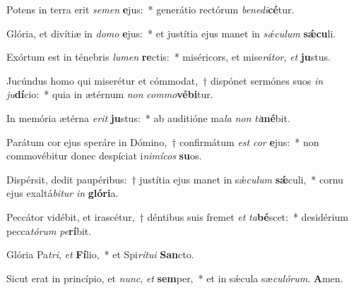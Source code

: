 ﻿\item Potens in terra erit \textit{se}\textit{men} \textbf{e}jus:~* generátio rectórum \textit{be}\textit{ne}\textit{di}\textbf{cé}tur.

\item Glória, et divítiæ in \textit{do}\textit{mo} \textbf{e}jus:~* et justítia ejus manet in \textit{sǽ}\textit{cu}\textit{lum} \textbf{sǽ}\textbf{cu}li.

\item Exórtum est in ténebris \textit{lu}\textit{men} \textbf{re}ctis:~* miséricors, et mise\textit{rá}\textit{tor}, \textit{et} \textbf{ju}stus.

\item Jucúndus homo qui miserétur et cómmodat,~† dispónet sermónes suos \textit{in} \textit{ju}\textbf{dí}cio:~* quia in ætérnum \textit{non} \textit{com}\textit{mo}\textbf{vé}\textbf{bi}tur.

\item In memória ætérna \textit{e}\textit{rit} \textbf{ju}stus:~* ab auditióne ma\textit{la} \textit{non} \textit{ti}\textbf{mé}bit.

\item Parátum cor ejus speráre in Dómino,~† confirmátum \textit{est} \textit{cor} \textbf{e}jus:~* non commovébitur donec despíciat i\textit{ni}\textit{mí}\textit{cos} \textbf{su}os.

\item Dispérsit, dedit paupéribus:~† justítia ejus manet in sǽ\textit{cu}\textit{lum} \textbf{sǽ}culi,~* cornu ejus exaltá\textit{bi}\textit{tur} \textit{in} \textbf{gló}\textbf{ri}a.

\item Peccátor vidébit, et irascétur,~† déntibus suis fremet \textit{et} \textit{ta}\textbf{bé}scet:~* desidérium pecca\textit{tó}\textit{rum} \textit{pe}\textbf{rí}bit.

\item Glória Pa\textit{tri}, \textit{et} \textbf{Fí}lio,~* et Spi\textit{rí}\textit{tu}\textit{i} \textbf{San}cto.

\item Sicut erat in princípio, et \textit{nunc}, \textit{et} \textbf{sem}per,~* et in sǽcula sæ\textit{cu}\textit{ló}\textit{rum}. \textbf{A}men.